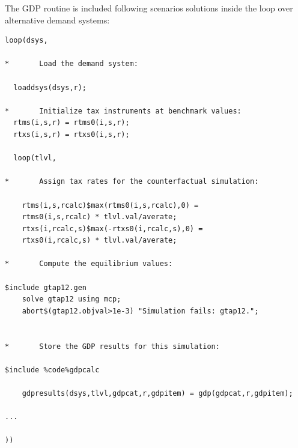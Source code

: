The GDP routine is included following scenarios solutions inside the
loop over alternative demand systems:

\begin{Verbatim}
loop(dsys,

*       Load the demand system:

  loaddsys(dsys,r);

*       Initialize tax instruments at benchmark values:
  rtms(i,s,r) = rtms0(i,s,r);
  rtxs(i,s,r) = rtxs0(i,s,r);

  loop(tlvl,

*       Assign tax rates for the counterfactual simulation:

    rtms(i,s,rcalc)$max(rtms0(i,s,rcalc),0) =
	rtms0(i,s,rcalc) * tlvl.val/averate;
    rtxs(i,rcalc,s)$max(-rtxs0(i,rcalc,s),0) =
	rtxs0(i,rcalc,s) * tlvl.val/averate;

*       Compute the equilibrium values:

$include gtap12.gen
    solve gtap12 using mcp;
    abort$(gtap12.objval>1e-3) "Simulation fails: gtap12.";


*       Store the GDP results for this simulation:

$include %code%gdpcalc

    gdpresults(dsys,tlvl,gdpcat,r,gdpitem) = gdp(gdpcat,r,gdpitem);

...

))

\end{Verbatim}
